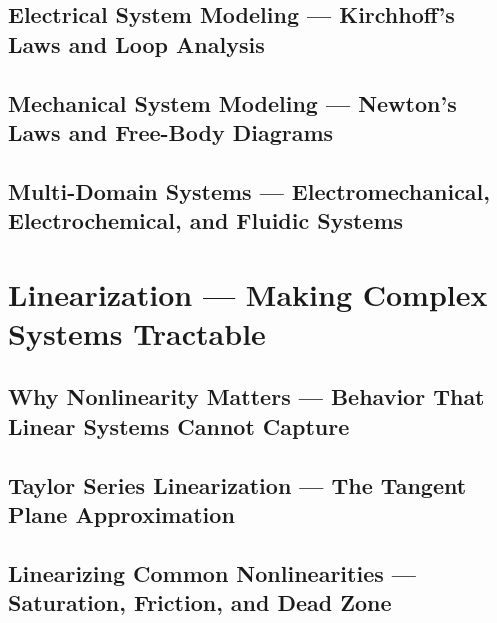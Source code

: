 \documentclass[11pt,letterpaper]{article}
\begin{document}


\subsection{Electrical System Modeling --- Kirchhoff's Laws and Loop Analysis}
\label{sec:electrical_modeling}



\subsection{Mechanical System Modeling --- Newton's Laws and Free-Body Diagrams}
\label{sec:mechanical_modeling}



\subsection{Multi-Domain Systems --- Electromechanical, Electrochemical, and Fluidic Systems}
\label{sec:multi_domain}



\section{Linearization --- Making Complex Systems Tractable}
\label{sec:linearization}

\subsection{Why Nonlinearity Matters --- Behavior That Linear Systems Cannot Capture}
\label{sec:why_nonlinearity}



\subsection{Taylor Series Linearization --- The Tangent Plane Approximation}
\label{sec:taylor_linearization}



\subsection{Linearizing Common Nonlinearities --- Saturation, Friction, and Dead Zone}
\label{sec:linearizing_nonlinearities}
\end{document}
